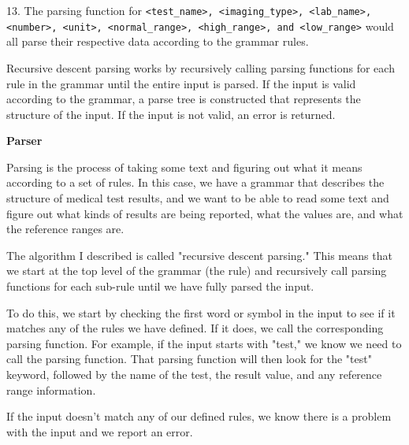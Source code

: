 13. The parsing function for \texttt{<test\_name>, <imaging\_type>, <lab\_name>, <number>, <unit>, <normal\_range>, <high\_range>, and <low\_range>} would all parse their respective data according to the grammar rules.

Recursive descent parsing works by recursively calling parsing functions for each rule in the grammar until the entire input is parsed. If the input is valid according to the grammar, a parse tree is constructed that represents the structure of the input. If the input is not valid, an error is returned.

\textbf{Parser}

Parsing is the process of taking some text and figuring out what it means according to a set of rules. In this case, we have a grammar that describes the structure of medical test results, and we want to be able to read some text and figure out what kinds of results are being reported, what the values are, and what the reference ranges are.

The algorithm I described is called "recursive descent parsing." This means that we start at the top level of the grammar (the rule) and recursively call parsing functions for each sub-rule until we have fully parsed the input.

To do this, we start by checking the first word or symbol in the input to see if it matches any of the rules we have defined. If it does, we call the corresponding parsing function. For example, if the input starts with "test," we know we need to call the parsing function. That parsing function will then look for the "test" keyword, followed by the name of the test, the result value, and any reference range information.

If the input doesn't match any of our defined rules, we know there is a problem with the input and we report an error.

